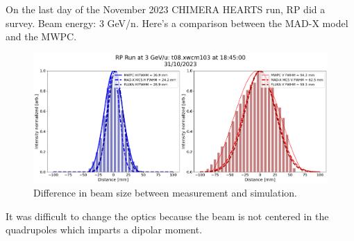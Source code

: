 \documentclass[a4paper,
               biblatex,     %
               ]{jacow}
\begin{document}





On the last day of the November 2023 CHIMERA HEARTS run, RP did a survey.
Beam energy: 3 GeV/n. Here's a comparison between the MAD-X model and the MWPC.

\begin{figure}[!htb]
   \centering
   \includegraphics*[width=1.0\columnwidth]{rp_survey.png}
   \caption{Difference in beam size between measurement and simulation.}
   \label{fig:diff_beam_size}
\end{figure}


It was difficult to change the optics because the beam is not centered in the quadrupoles which imparts a dipolar moment.
\end{document}
